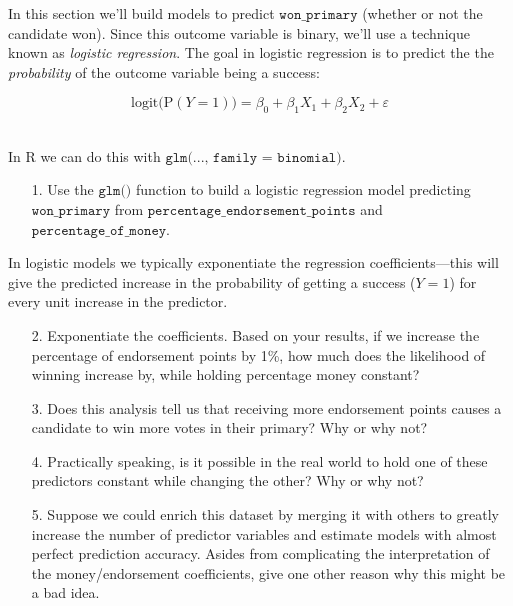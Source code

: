 \documentclass[10pt]{extarticle}
\renewcommand{\P}{\text{P}}
\begin{document}
In this section we'll build models to predict $\texttt{won}\_\texttt{primary}$ (whether or not the candidate won). Since this outcome variable is binary, we'll use a technique known as {\it logistic regression}. The goal in logistic regression is to predict the the {\it probability} of the outcome variable being a success:

$$\text{logit}\big( \P(Y=1) \big) = \beta_0 + \beta_1 X_1 + \beta_2 X_2 + \varepsilon$$ \ 

In R we can do this with $\texttt{glm(..., family = binomial)}$. \\ 

\begin{itemize}

    \item[1.] Use the $\texttt{glm()}$ function to build a logistic regression model predicting $\texttt{won}\_\texttt{primary}$ from $\texttt{percentage}\_\texttt{endorsement}\_\texttt{points}$ and $\texttt{percentage}\_\texttt{of}\_\texttt{money}$. 
    
\end{itemize}

\hfill 

In logistic models we typically exponentiate the regression coefficients---this will give the predicted increase in the probability of getting a success ($Y=1$) for every unit increase in the predictor. \\ 

\begin{itemize}
    
    \item[2.] Exponentiate the coefficients. Based on your results, if we increase the percentage of endorsement points by 1\%, how much does the likelihood of winning increase by, while holding percentage money constant? \\ 
    
    \item[3.] Does this analysis tell us that receiving more endorsement points causes a candidate to win more votes in their primary? Why or why not? \\ 
    
    \item[4.] Practically speaking, is it possible in the real world to hold one of these predictors constant while changing the other? Why or why not? \\ 
    
    \item[5.] Suppose we could enrich this dataset by merging it with others to greatly increase the number of predictor variables and estimate models with almost perfect prediction accuracy. Asides from complicating the interpretation of the money/endorsement coefficients, give one other reason why this might be a bad idea. \\ 
    
\end{itemize}
    
\end{document}
